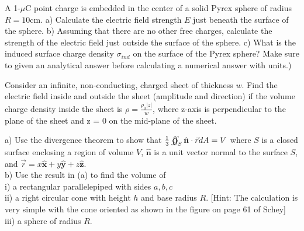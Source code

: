 \documentclass[11pt,letterpaper,boxed]{hmcpset}
\begin{document}
	\begin{problem}[HRK E29.29]
A 1-$\mu$C point charge is embedded in the center of a solid Pyrex sphere of radius $R = 10$cm. a) Calculate the electric field strength $E$ just beneath the surface of the sphere. b) Assuming that there are no other free charges, calculate the strength of the electric field just outside the surface of the sphere. c) What is the induced surface charge density $\sigma_{ind}$ on the surface of the Pyrex sphere?
Make sure to given an analytical answer before calculating a numerical answer with units.)
		
	\end{problem}
	
	\begin{solution}
		\vfill
	\end{solution}
	\newpage	
	
	\begin{problem}Consider an infinite, non-conducting, charged sheet of thickness $w$. Find the electric field inside and outside the sheet (amplitude and direction) if the volume charge density inside the sheet is $\rho = \frac{\rho_0|z|}{w}$, where z-axis is perpendicular to the plane of the sheet and z = 0 on the mid-plane
of the sheet.
	\end{problem}
	
	\begin{solution}
		\vfill
	\end{solution}
	\newpage
	
	\begin{problem}[Schey: II-26]
a) Use the divergence theorem to show that $\frac{1}{3} \varoiint_S \hat{\mathbf{n}} \cdot \vec{r} dA = V$ where $S$ is a closed surface enclosing a region of volume $V$, $\hat{\mathbf{n}}$ is a unit vector normal to the surface $S$, and $\vec{r} = x\hat{\mathbf{x}} + y\hat{\mathbf{y}} + z\hat{\mathbf{z}}$.\\
b) Use the result in (a) to find the volume of \\
i) a rectangular parallelepiped with sides $a, b, c$ \\
ii) a right circular cone with height $h$ and base radius $R$. [Hint: The calculation is very simple
with the cone oriented as shown in the figure on page 61 of Schey] \\
iii) a sphere of radius $R$.

	\end{problem}
	
	\begin{solution}
		\vfill
	\end{solution}
	\newpage
	
\end{document}
